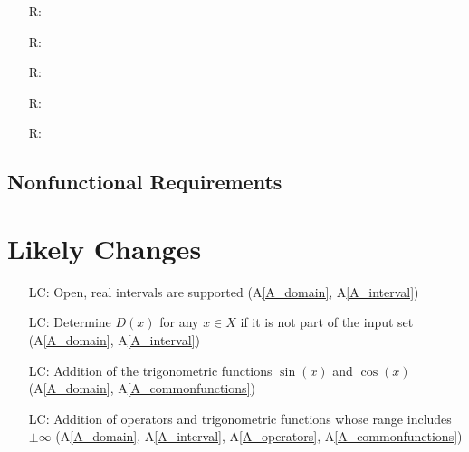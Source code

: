 \documentclass[12pt]{article}
\newcommand{\aref}[1]{A\ref{#1}}
\newcounter{reqnum} %
\newcounter{lcnum} %
\begin{document}
\noindent \begin{itemize}

\item[R\refstepcounter{reqnum}\thereqnum \label{R_Inputs}:] 

\item[R\refstepcounter{reqnum}\thereqnum \label{R_OutputInputs}:] 

\item[R\refstepcounter{reqnum}\thereqnum \label{R_Calculate}:] 

\item[R\refstepcounter{reqnum}\thereqnum \label{R_VerifyOutput}:]

\item[R\refstepcounter{reqnum}\thereqnum \label{R_Output}:] 

\end{itemize}

\subsection{Nonfunctional Requirements}


\section{Likely Changes}    
\label{changes}

\noindent \begin{itemize}

\item[LC\refstepcounter{lcnum}\thelcnum\label{LC_openinterval}:] Open, real 
intervals are supported (\aref{A_domain}, \aref{A_interval})

\item[LC\refstepcounter{lcnum}\thelcnum\label{LC_unknownDomain}:] Determine 
$D(x)$ for any $x \in X$ if it is not part of the input set (\aref{A_domain}, 
\aref{A_interval})

\item[LC\refstepcounter{lcnum}\thelcnum\label{LC_trig}:] Addition of the 
trigonometric functions $\sin(x)$ and $\cos(x)$ (\aref{A_domain}, 
\aref{A_commonfunctions})

\item[LC\refstepcounter{lcnum}\thelcnum\label{LC_infinity}:] Addition of 
operators and trigonometric functions whose range includes $\pm\infty$ 
(\aref{A_domain}, \aref{A_interval}, \aref{A_operators}, 
\aref{A_commonfunctions})

\end{itemize}
\end{document}
